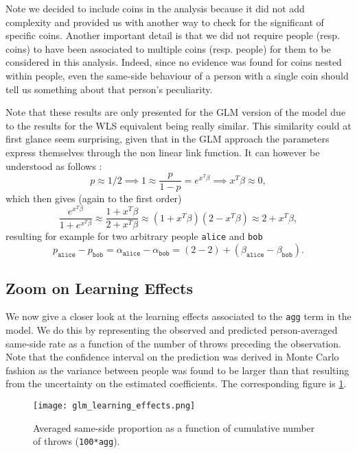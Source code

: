 \documentclass[a4paper, 12pt,oneside]{article}
\begin{document}
			Note we decided to include coins in the analysis because it did not add complexity and provided us with another way to check for the significant of specific coins. 
			Another important detail is that we did not require people (resp. coins) to have been associated to multiple coins (resp. people) for them to be considered in this analysis. Indeed, since no evidence was found for coins nested within people, even the same-side behaviour of a person with a single coin should tell us something about that person's peculiarity.

			Note that these results are only presented for the GLM version of the model due to the results for the WLS equivalent being really similar. This similarity could at first glance seem surprising, given that in the GLM approach the parameters express themselves through the non linear link function. It can however be understood as follows :
			\begin{equation*}
				p\approx 1/2 \implies 1 \approx \frac{p}{1-p} 
										= e^{x^T \beta} \implies x^T\beta\approx 0,
			\end{equation*}
			which then gives (again to the first order)
			\begin{equation*}
				\frac{e^{x^T\beta}}{1+e^{x^T\beta}}\approx \frac{1+x^T\beta}{2+x^T\beta}
									\approx (1+x^T\beta)(2-x^T\beta) \approx 2 + x^T\beta,
			\end{equation*}
			resulting for example for two arbitrary people \texttt{alice} and \texttt{bob} 
			\begin{equation*}			
				p_{\texttt{alice}}-p_{\texttt{bob}}=\alpha_{\texttt{alice}} - \alpha_{\texttt{bob}}=(2-2)+(\beta_{\texttt{alice}} - \beta_{\texttt{bob}}).
			\end{equation*}
		\subsection{Zoom on Learning Effects}
			We now give a closer look at the learning effects associated to the \texttt{agg} term in the model. We do this by representing the observed and predicted person-averaged same-side rate as a function of the number of throws preceding the observation.  Note that the confidence interval on the prediction was derived in Monte Carlo fashion as the variance between people was found to be larger than that resulting from the uncertainty on the estimated coefficients. 
			The corresponding figure is \ref{fig:learning-effects}.
			\begin{figure}[htb]
				\centering
				\texttt{[image: glm\_learning\_effects.png]}
				\caption{Averaged same-side proportion as a function of cumulative number of throws (\texttt{100*agg}).}
				\label{fig:learning-effects}
			\end{figure}
			
\end{document}
